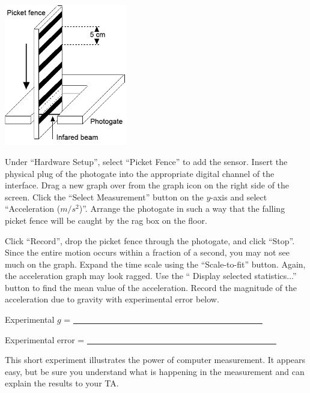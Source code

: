 \begin{center} \includegraphics*[width=0.4\textwidth]{imgs/6labs/6Alab/6Aexp3/exp_fig7_fx.jpg} \end{center}

Under ``Hardware Setup'', select ``Picket Fence'' to add the sensor.  Insert the physical plug of the photogate into the appropriate digital channel of the interface.  Drag a new graph over from the graph icon on the right side of the screen.  Click the ``Select Measurement'' button on the \(y\)-axis and select ``Acceleration ($m/s^2$)''.  Arrange the photogate in such a way that the falling picket fence will be caught by the rag box on the floor.

Click ``Record'', drop the picket fence through the photogate, and click ``Stop''.  Since the entire motion occurs within a fraction of a second, you may not see much on the graph.  Expand the time scale using the ``Scale-to-fit'' button.  Again, the acceleration graph may look ragged.  Use the `` Display selected statistics...'' button to find the mean value of the acceleration.  Record the magnitude of the acceleration due to gravity with experimental error below.

Experimental \(g\) = \ul{~~~~~~~~~~~~~~~~~~~~~~~~~~~~~~~~~~~~~~~~~~~~~}

Experimental error = \ul{~~~~~~~~~~~~~~~~~~~~~~~~~~~~~~~~~~~~~~~~~~~~~}

This short experiment illustrates the power of computer measurement.  It appears easy, but be sure you understand what is happening in the measurement and can explain the results to your TA.
